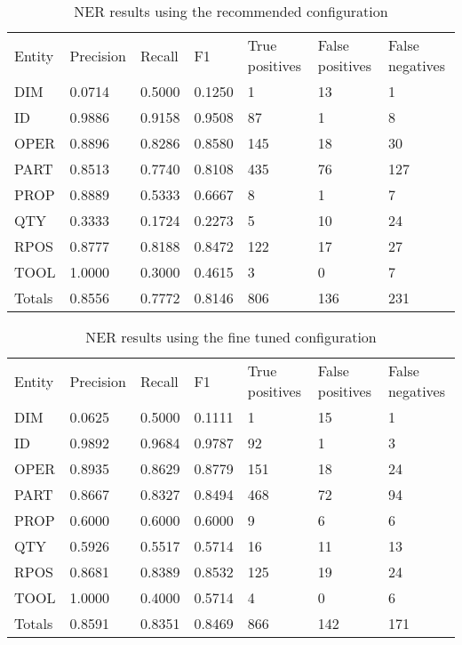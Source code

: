 \begin{table}[ht]
	\caption{NER results using the recommended configuration}
	\centering
	\begin{tabu} { X[c,m] X[r,m] X[r,m] X[r,m] X[r,m] X[r,m] X[r,m] }
		\rowfont{\bfseries\itshape} Entity & Precision & Recall & F1 & True positives & False positives & False negatives \\
		\lasthline
		DIM & 0.0714 & 0.5000 & 0.1250 & 1 & 13 & 1 \\
		ID & 0.9886 & 0.9158 & 0.9508 & 87 & 1 & 8 \\
		OPER & 0.8896 & 0.8286 & 0.8580 & 145 & 18 & 30 \\
		PART & 0.8513 & 0.7740 & 0.8108 & 435 & 76 & 127 \\
		PROP & 0.8889 & 0.5333 & 0.6667 & 8 & 1 & 7 \\
		QTY & 0.3333 & 0.1724 & 0.2273 & 5 & 10 & 24 \\
		RPOS & 0.8777 & 0.8188 & 0.8472 & 122 & 17 & 27 \\
		TOOL & 1.0000 & 0.3000 & 0.4615 & 3 & 0 & 7 \\
		\rowfont{\bfseries} Totals & 0.8556 & 0.7772 & 0.8146 & 806 & 136 & 231 \\
	\end{tabu}
	\label{tab:results_recommended-configuration}
\end{table}


\begin{table}[ht]
	\caption{NER results using the fine tuned configuration}
	\centering
	\begin{tabu} { X[c,m] X[r,m] X[r,m] X[r,m] X[r,m] X[r,m] X[r,m] }
		\rowfont{\bfseries\itshape} Entity & Precision & Recall & F1 & True positives & False positives & False negatives \\
		\lasthline
		DIM & 0.0625 & 0.5000 & 0.1111 & 1 & 15 & 1 \\
		ID & 0.9892 & 0.9684 & 0.9787 & 92 & 1 & 3 \\
		OPER & 0.8935 & 0.8629 & 0.8779 & 151 & 18 & 24 \\
		PART & 0.8667 & 0.8327 & 0.8494 & 468 & 72 & 94 \\
		PROP & 0.6000 & 0.6000 & 0.6000 & 9 & 6 & 6 \\
		QTY & 0.5926 & 0.5517 & 0.5714 & 16 & 11 & 13 \\
		RPOS & 0.8681 & 0.8389 & 0.8532 & 125 & 19 & 24 \\
		TOOL & 1.0000 & 0.4000 & 0.5714 & 4 & 0 & 6 \\
		\rowfont{\bfseries} Totals & 0.8591 & 0.8351 & 0.8469 & 866 & 142 & 171 \\
	\end{tabu}
	\label{tab:results_optimal-configuration}
\end{table}
